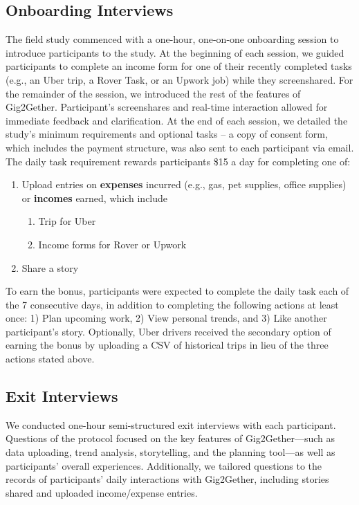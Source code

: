 \subsection{Onboarding Interviews}
The field study commenced with a one-hour, one-on-one onboarding session to introduce participants to the study. At the beginning of each session, we guided participants to complete an income form for one of their recently completed tasks (e.g., an Uber trip, a Rover Task, or an Upwork job) while they screenshared. For the remainder of the session, we introduced the rest of the features of Gig2Gether. Participant's screenshares and real-time interaction allowed for immediate feedback and clarification. 
At the end of each session, we detailed the study's minimum requirements and optional tasks -- a copy of consent form, which includes the payment structure, was also sent to each participant via email. The daily task requirement rewards participants \$15 a day for completing one of:
\begin{enumerate}
    \item Upload entries on \textbf{expenses} incurred (e.g., gas, pet supplies, office supplies) or \textbf{incomes} earned, which include
    \begin{enumerate}
        \item  Trip for Uber
        \item Income forms for Rover or Upwork
    \end{enumerate}
    \item Share a story
\end{enumerate}
To earn the bonus, participants were expected to complete the daily task each of the 7 consecutive days, in addition to completing the following actions at least once: 1) Plan upcoming work, 2) View personal trends, and 3) Like another participant's story. 
Optionally, Uber drivers received the secondary option of earning the bonus by uploading a CSV of historical trips in lieu of the three actions stated above. 


\subsection{Exit Interviews} 
We conducted one-hour semi-structured exit interviews with each participant. Questions of the protocol focused on the key features of Gig2Gether—such as data uploading, trend analysis, storytelling, and the planning tool—as well as participants' overall experiences. Additionally, we tailored questions to the records of participants' daily interactions with Gig2Gether, including stories shared and uploaded income/expense entries. 

